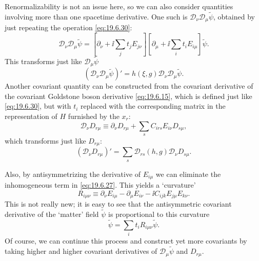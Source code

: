 Renormalizability is not an issue here, so we can also consider quantities involving more than one spacetime derivative. One such is $\mathcal D_\nu\mathcal D_\mu\widetilde\psi$, obtained by just repeating the operation \eqref{eq:19.6.30}:
\begin{equation}
\mathcal D_\nu\mathcal D_\mu\widetilde\psi
=\left[\partial_\nu+\ii\sum_jt_jE_{j\nu}\right]
\left[\partial_\mu+\ii\sum_it_iE_{i\mu}\right]\widetilde\psi.
\tag{19.6.31}\label{eq:19.6.31}
\end{equation}
This transforms just like $\mathcal D_\mu\widetilde\psi$
\begin{equation}
\left(\mathcal D_\nu\mathcal D_\mu\widetilde\psi\right)'
=h(\xi,g)\mathcal D_\nu\mathcal D_\mu\widetilde\psi.
\tag{19.6.32}\label{eq:19.6.32}
\end{equation}
Another covariant quantity can be constructed from the covariant derivative of the covariant Goldstone boson derivative \eqref{eq:19.6.15}, which is defined just like \eqref{eq:19.6.30}, but with $t_i$ replaced with the corresponding matrix in the representation of $H$ furnished by the $x_r$:
\begin{equation}
\mathcal D_\nu D_{r\mu}
\equiv\partial_\nu D_{r\mu}
+\sum_s C_{irs}E_{i\nu}D_{s\mu},
\tag{19.6.33}\label{eq:19.6.33}
\end{equation}
which transforms just like $D_{r\mu}$:
\begin{equation}
\left(\mathcal D_\nu D_{r\mu}\right)'
=\sum_s\mathcal D_{rs}(h,g)\mathcal D_\nu D_{s\mu}.
\tag{19.6.34}\label{eq:19.6.34}
\end{equation}

Also, by antisymmetrizing the derivative of $E_{i\mu}$ we can eliminate the inhomogeneous term in \eqref{eq:19.6.27}. This yields a `curvature'
\begin{equation}
R_{i\mu\nu}
\equiv\partial_\nu E_{i\mu}-\partial_\mu E_{i\nu}
-\ii C_{ijk}E_{j\mu}E_{k\nu}.
\tag{19.6.35}\label{eq:19.6.35}
\end{equation}
This is not really new; it is easy to see that the antisymmetric covariant derivative of the `matter' field $\widetilde\psi$ is proportional to this curvature
\begin{equation}
[\mathcal D_\nu,\mathcal D_\mu]\widetilde\psi
=\sum_i t_iR_{i\mu\nu}\widetilde\psi.
\tag{19.6.36}\label{eq:19.6.36}
\end{equation}
Of course, we can continue this process and construct yet more covariants by taking higher and higher covariant derivatives of $\mathcal D_\mu\widetilde\psi$ and $D_{r\mu}$.

